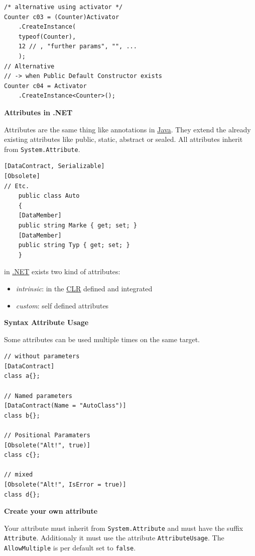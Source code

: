 \documentclass[11pt,twoside,landscape]{article}
\begin{document}
\begin{multicols}{3}
\begin{lstlisting}
/* alternative using activator */
Counter c03 = (Counter)Activator
    .CreateInstance(
	typeof(Counter),
	12 // , "further params", "", ...
    );
// Alternative
// -> when Public Default Constructor exists
Counter c04 = Activator
    .CreateInstance<Counter>();
\end{lstlisting}

\textbf{Attributes in .NET}

Attributes are the same thing like annotations in \href{../../../roam/20201116150053-java.org}{Java}.
They extend the already existing attributes like public, static, abstract or sealed.
All attributes inherit from \texttt{System.Attribute}.

\lstset{language=csharp,label= ,caption= ,captionpos=b,numbers=none}
\begin{lstlisting}
[DataContract, Serializable]
[Obsolete]
// Etc.
    public class Auto
    {
	[DataMember]
	public string Marke { get; set; }
	[DataMember]
	public string Typ { get; set; }
    }
\end{lstlisting}


in \href{../../../roam/20211003114703-net.org}{.NET} exists two kind of attributes:
\begin{itemize}
\item \emph{intrinsic}: in the \href{../../../roam/20211003114644-common_language_runtime.org}{CLR} defined and integrated
\item \emph{custom}: self defined attributes
\end{itemize}


\textbf{Syntax Attribute Usage}

Some attributes can be used multiple times on the same target.

\lstset{language=csharp,label= ,caption= ,captionpos=b,numbers=none}
\begin{lstlisting}
// without parameters
[DataContract]
class a{};

// Named parameters
[DataContract(Name = "AutoClass")]
class b{};

// Positional Paramaters
[Obsolete("Alt!", true)]
class c{};

// mixed
[Obsolete("Alt!", IsError = true)]
class d{};
\end{lstlisting}

\textbf{Create your own attribute}

Your attribute must inherit from \texttt{System.Attribute} and must have the suffix \texttt{Attribute}.
Additionaly it must use the attribute \texttt{AttributeUsage}.
The \texttt{AllowMultiple} is per default set to \texttt{false}.


\end{multicols}
\end{document}
